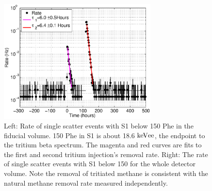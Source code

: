 \begin{figure}[h!]\centering
\includegraphics[width=80mm]{CH3T_Rate_fid_150_Run03_Tritium_Rate.eps}
\caption{Left: Rate of single scatter events with S1 below 150 Phe in the fiducial volume. 150 Phe in S1 is about 18.6 $\rm keV{ee}$, the endpoint to the tritium beta spectrum. The magenta and red curves are fits to the first and second tritium injection's removal rate. Right: The rate of single scatter events with S1 below 150 for the whole detector volume. Note the removal of tritiated methane is consistent with the natural methane removal rate measured independently.}
\label{fig:Removal}
\end{figure}


